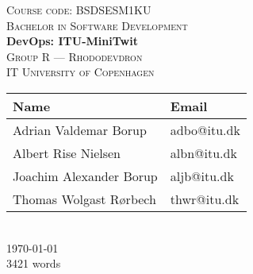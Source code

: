 \newcommand{\HRule}{\rule{1.25\linewidth}{0.5mm}}
\center
\vspace*{-4.35cm}
%
\vspace{3cm}
\textsc{\large Course code: BSDSESM1KU}
\\[0.2cm]
\textsc{\large Bachelor in Software Development}
\\[0.5cm]
\hbox{\makebox[1\textwidth][c]{\HRule}}
\vspace{0.4cm}
{ \huge \bfseries DevOps: ITU-MiniTwit}
\\[0.6cm]
\hbox{\makebox[1\textwidth][c]{\HRule}}
\vspace{0.9cm}
\textsc{\Large Group R --- Rhododevdron\\[0.5cm]IT University of Copenhagen}\\[1.5cm]
\begin{tabular}{ll}
\toprule
\textbf{Name} & \textbf{Email} \\
\midrule
Adrian Valdemar Borup & adbo@itu.dk \\
Albert Rise Nielsen & albn@itu.dk \\
Joachim Alexander Borup & aljb@itu.dk \\
Thomas Wolgast Rørbech & thwr@itu.dk \\
\bottomrule
\end{tabular}
\\[2cm]
{\large \today}
\\[1.5cm]
{\large 3421 words}
\vfill
